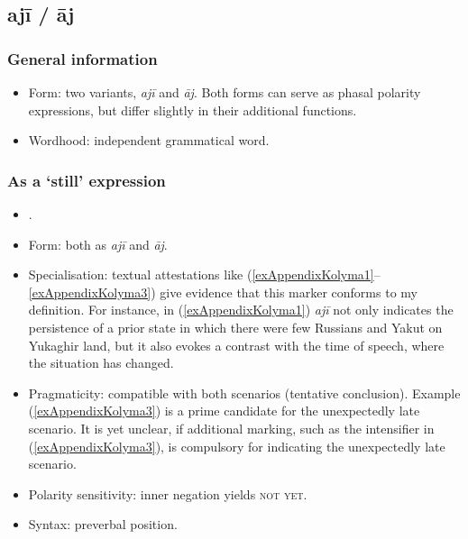\subsection{ajī / āj}

\subsubsection{General information}
\begin{itemize}
	\item Form: two variants, \textit{ajī} and \textit{āj}. Both forms can serve as phasal polarity expressions, but differ slightly in their additional functions.
	\item Wordhood: independent grammatical word.
\end{itemize}


\subsubsection{As a \lq{}still\rq{ }expression}
\begin{itemize}
	\item \textcite[531–532]{Maslova2003}.
	\item Form:  both as \textit{ajī} and \textit{āj}.
	\item Specialisation: textual attestations like (\ref{exAppendixKolyma1}–\ref{exAppendixKolyma3}) give evidence that this marker conforms to my definition. For instance, in (\ref{exAppendixKolyma1}) \textit{ajī} not only indicates the persistence of a prior state in which there were few Russians and Yakut on Yukaghir land, but it also evokes a contrast with the time of speech, where the situation has changed. 
	
	\item Pragmaticity: compatible with both scenarios (tentative conclusion). Example (\ref{exAppendixKolyma3}) is a prime candidate for the unexpectedly late scenario. It is yet unclear, if additional marking, such as the intensifier in (\ref{exAppendixKolyma3}), is compulsory for indicating the unexpectedly late scenario.
	\item Polarity sensitivity: inner negation yields \textsc{not yet}.
	\item Syntax: preverbal position.
\end{itemize}

